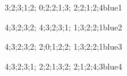 \documentclass[12pt]{article}
\begin{document}

\phantieudeTrangAnswerCCa

\answerCauHoiDongCCa
{3;2;3;1;2;
0;2;2;1;3;
2;2;1;2;4}{blue}{1}%

\answerCauHoiDongCCa
{4;3;2;3;2;
4;3;2;3;1;
1;3;2;2;1}{blue}{2}%

\answerCauHoiDongCCa
{4;3;2;3;2;
2;0;1;2;2;
1;3;2;2;1}{blue}{3}%

\answerCauHoiDongCCa 
{4;3;2;3;1;
2;2;1;3;2;
2;1;2;4;3}{blue}{4}%
\end{document}
